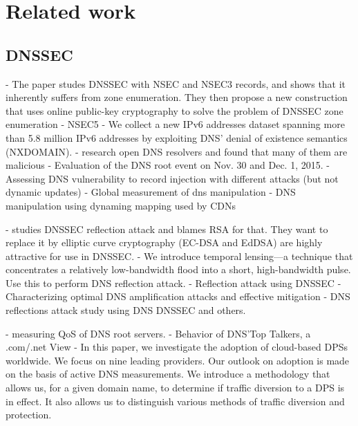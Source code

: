 \section{Related work}


\subsection{DNSSEC}
\cite{goldberg2015nsec5} - The paper studes DNSSEC with NSEC and NSEC3 records, and shows that it inherently suffers from zone enumeration. They then propose a new construction that uses online public-key cryptography to solve the problem of DNSSEC zone enumeration - NSEC5
\cite{fiebig2017something} - We collect a new IPv6 addresses dataset spanning more than 5.8 million IPv6 addresses by exploiting DNS’ denial of existence semantics (NXDOMAIN).
\cite{kuhrer2015going} - research open DNS resolvers and found that many of them are malicious
\cite{moura2016anycast} - Evaluation of the DNS root event on Nov. 30 and Dec. 1, 2015.
\cite{schomp2014assessing} - Assessing DNS vulnerability to record injection with different attacks (but not dynamic updates)
\cite{pearce2017global} - Global measurement of dns manipulation
\cite{hao2018end} - DNS manipulation using dynaming mapping used by CDNs


\cite{van2015making} - studies DNSSEC reflection attack and blames RSA for that. They want to replace it by  elliptic curve cryptography (EC-DSA and EdDSA) are highly attractive for use in DNSSEC.
\cite{rasti2015temporal} - We introduce temporal lensing—a technique that concentrates a relatively low-bandwidth flood into a short, high-bandwidth pulse. Use this to perform DNS reflection attack. 
\cite{van2014dnssec} - Reflection attack using DNSSEC
\cite{macfarland2015characterizing} - Characterizing optimal DNS amplification attacks and effective mitigation
\cite{rossow2014amplification} - DNS reflections attack study using DNS DNSSEC and others. 




\cite{liang2013measuring} - measuring QoS of DNS root servers. 
\cite{osterweil2012behavior} - Behavior of DNS’Top Talkers, a .com/.net View
\cite{jonker2016measuring} - In this paper, we investigate the adoption of cloud-based DPSs worldwide. We focus on nine leading providers. Our outlook on adoption is made on the basis of active DNS measurements. We introduce a methodology that allows us, for a given domain name, to determine if traffic diversion to a DPS is in effect. It also allows us to distinguish various methods of traffic diversion and protection. 


